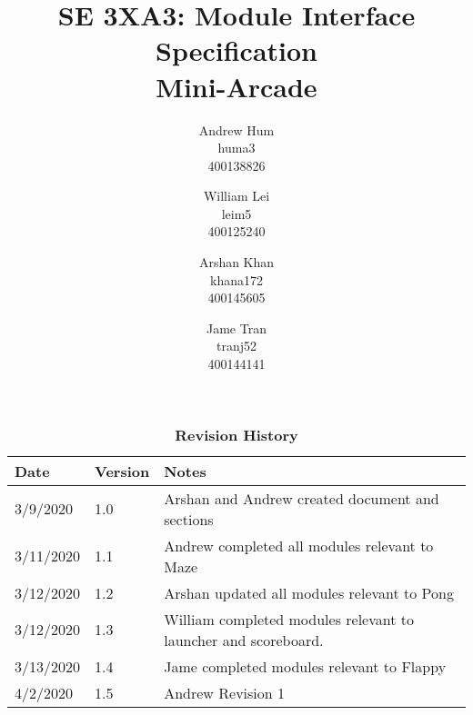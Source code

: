 \documentclass[12pt, titlepage]{article}
\title{SE 3XA3: Module Interface Specification\\Mini-Arcade}
\author{Andrew Hum \\ huma3 \\ 400138826 \and
		William Lei \\ leim5 \\ 400125240 \and
		Arshan Khan \\ khana172 \\ 400145605 \and
		Jame Tran \\ tranj52 \\ 400144141
}
\date{}
\begin{document}
\newpage

\maketitle
\maketitle
\newpage
\tableofcontents

\begin{table}[bp]
\caption{\bf Revision History}
\begin{tabularx}{\textwidth}{p{3cm}p{2cm}X}
\toprule {\bf Date} & {\bf Version} & {\bf Notes}\\
\midrule
3/9/2020 & 1.0 & Arshan and Andrew created document and sections\\
3/11/2020 & 1.1 & Andrew completed all modules relevant to Maze\\
3/12/2020 & 1.2 & Arshan updated all modules relevant to Pong\\
3/12/2020 & 1.3 & William completed modules relevant to launcher and scoreboard.\\
3/13/2020 & 1.4 & Jame completed modules relevant to Flappy\\
4/2/2020 & 1.5 & Andrew Revision 1\\
\bottomrule
\end{tabularx}
\end{table}

\newpage
\end{document}
